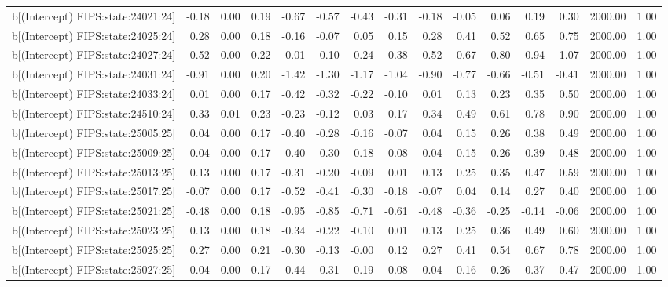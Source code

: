 \begin{table}[ht]
\begin{tabular}{rrrrrrrrrrrrrrr}
  b[(Intercept) FIPS:state:24021:24] & -0.18 & 0.00 & 0.19 & -0.67 & -0.57 & -0.43 & -0.31 & -0.18 & -0.05 & 0.06 & 0.19 & 0.30 & 2000.00 & 1.00 \\ 
  b[(Intercept) FIPS:state:24025:24] & 0.28 & 0.00 & 0.18 & -0.16 & -0.07 & 0.05 & 0.15 & 0.28 & 0.41 & 0.52 & 0.65 & 0.75 & 2000.00 & 1.00 \\ 
  b[(Intercept) FIPS:state:24027:24] & 0.52 & 0.00 & 0.22 & 0.01 & 0.10 & 0.24 & 0.38 & 0.52 & 0.67 & 0.80 & 0.94 & 1.07 & 2000.00 & 1.00 \\ 
  b[(Intercept) FIPS:state:24031:24] & -0.91 & 0.00 & 0.20 & -1.42 & -1.30 & -1.17 & -1.04 & -0.90 & -0.77 & -0.66 & -0.51 & -0.41 & 2000.00 & 1.00 \\ 
  b[(Intercept) FIPS:state:24033:24] & 0.01 & 0.00 & 0.17 & -0.42 & -0.32 & -0.22 & -0.10 & 0.01 & 0.13 & 0.23 & 0.35 & 0.50 & 2000.00 & 1.00 \\ 
  b[(Intercept) FIPS:state:24510:24] & 0.33 & 0.01 & 0.23 & -0.23 & -0.12 & 0.03 & 0.17 & 0.34 & 0.49 & 0.61 & 0.78 & 0.90 & 2000.00 & 1.00 \\ 
  b[(Intercept) FIPS:state:25005:25] & 0.04 & 0.00 & 0.17 & -0.40 & -0.28 & -0.16 & -0.07 & 0.04 & 0.15 & 0.26 & 0.38 & 0.49 & 2000.00 & 1.00 \\ 
  b[(Intercept) FIPS:state:25009:25] & 0.04 & 0.00 & 0.17 & -0.40 & -0.30 & -0.18 & -0.08 & 0.04 & 0.15 & 0.26 & 0.39 & 0.48 & 2000.00 & 1.00 \\ 
  b[(Intercept) FIPS:state:25013:25] & 0.13 & 0.00 & 0.17 & -0.31 & -0.20 & -0.09 & 0.01 & 0.13 & 0.25 & 0.35 & 0.47 & 0.59 & 2000.00 & 1.00 \\ 
  b[(Intercept) FIPS:state:25017:25] & -0.07 & 0.00 & 0.17 & -0.52 & -0.41 & -0.30 & -0.18 & -0.07 & 0.04 & 0.14 & 0.27 & 0.40 & 2000.00 & 1.00 \\ 
  b[(Intercept) FIPS:state:25021:25] & -0.48 & 0.00 & 0.18 & -0.95 & -0.85 & -0.71 & -0.61 & -0.48 & -0.36 & -0.25 & -0.14 & -0.06 & 2000.00 & 1.00 \\ 
  b[(Intercept) FIPS:state:25023:25] & 0.13 & 0.00 & 0.18 & -0.34 & -0.22 & -0.10 & 0.01 & 0.13 & 0.25 & 0.36 & 0.49 & 0.60 & 2000.00 & 1.00 \\ 
  b[(Intercept) FIPS:state:25025:25] & 0.27 & 0.00 & 0.21 & -0.30 & -0.13 & -0.00 & 0.12 & 0.27 & 0.41 & 0.54 & 0.67 & 0.78 & 2000.00 & 1.00 \\ 
  b[(Intercept) FIPS:state:25027:25] & 0.04 & 0.00 & 0.17 & -0.44 & -0.31 & -0.19 & -0.08 & 0.04 & 0.16 & 0.26 & 0.37 & 0.47 & 2000.00 & 1.00 \\ 

\end{tabular}
\end{table}
